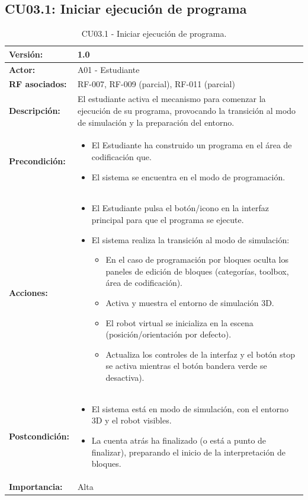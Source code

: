 \subsection{CU03.1: Iniciar ejecución de programa} \label{sec:CU03_1_IniciarEjecucion}
\begin{table}[H]
	\centering
	\begin{tabularx}{\linewidth}{|p{3cm}|X|}
		\hline
		\textbf{Versión:} & 1.0 \\
		\hline
		\textbf{Actor:} & A01 - Estudiante \\
		\hline
		\textbf{RF asociados:} & RF-007, RF-009 (parcial), RF-011 (parcial) \\
		\hline
		\textbf{Descripción:} & El estudiante activa el mecanismo para comenzar la ejecución de su programa, provocando la transición al modo de simulación y la preparación del entorno. \\
		\hline
		\textbf{Precondición:} & 
		\begin{itemize}
			\item El Estudiante ha construido un programa en el área de codificación que.
			\item El sistema se encuentra en el modo de programación.
		\end{itemize} \\
		\hline
		\textbf{Acciones:} & 
		\begin{itemize}
			\item El Estudiante pulsa el botón/icono en la interfaz principal para que el programa se ejecute.
			\item El sistema realiza la transición al modo de simulación:
			\begin{itemize}
				\item En el caso de programación por bloques oculta los paneles de edición de bloques (categorías, toolbox, área de codificación).
				\item Activa y muestra el entorno de simulación 3D.
				\item El robot virtual se inicializa en la escena (posición/orientación por defecto).
				\item Actualiza los controles de la interfaz y el botón stop se activa mientras el botón bandera verde se desactiva).
			\end{itemize}
			\end{itemize} \\
		\hline
		\textbf{Postcondición:} & 
		\begin{itemize}
			\item El sistema está en modo de simulación, con el entorno 3D y el robot visibles.
			\item La cuenta atrás ha finalizado (o está a punto de finalizar), preparando el inicio de la interpretación de bloques.
		\end{itemize} \\
		\hline
	
		\textbf{Importancia:} & Alta \\
		\hline
	\end{tabularx}
	\caption{CU03.1 - Iniciar ejecución de programa.}
	\label{tabla:CU03_1_IniciarEjecucion}
\end{table}

